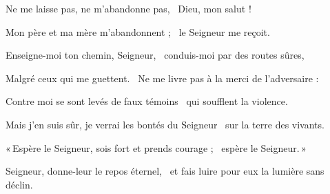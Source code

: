 \item Ne me laisse pas, ne m'abandonne pas,~\psstar{} Dieu, mon salut !

\item Mon père et ma mère m'abandonnent ;~\psstar{} le Seigneur me reçoit.

\item Enseigne-moi ton chemin, Seigneur,~\psstar{} conduis-moi par des routes sûres,

\item Malgré ceux qui me guettent.~\psstar{} Ne me livre pas à la merci de l'adversaire :

\item Contre moi se sont levés de faux témoins~\psstar{} qui soufflent la violence.

\item Mais j'en suis sûr, je verrai les bontés du Seigneur~\psstar{} sur la terre des vivants.~\psstar{}

\item «\,Espère le Seigneur, sois fort et prends courage ;~\psstar{} espère le Seigneur.\,»

\item Seigneur, donne-leur le repos éternel,~\psstar{} et fais luire pour eux la lumière sans déclin.